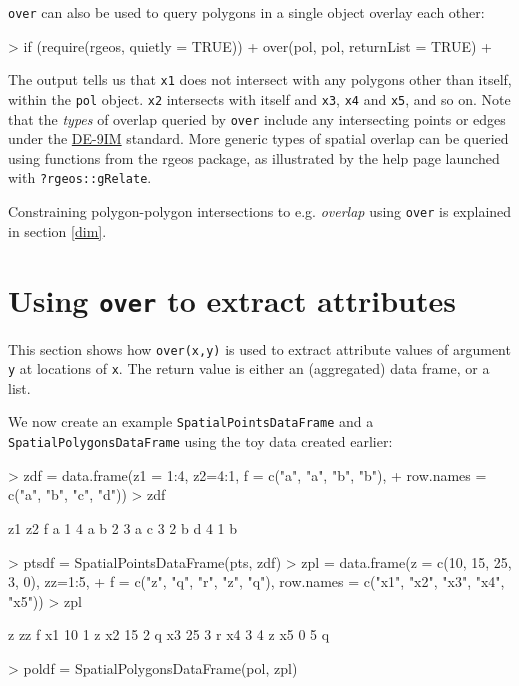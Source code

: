 \documentclass{article}
\newcommand{\code}[1]{{\tt #1}}
\begin{document}
\code{over} can also be used to query polygons in a single object overlay each other:

\begin{Schunk}
\begin{Sinput}
> if (require(rgeos, quietly = TRUE)) {
+  over(pol, pol, returnList = TRUE)
+ }
\end{Sinput}
\end{Schunk}

\noindent
The output tells us that \code{x1} does not intersect with any polygons other than itself, within the \code{pol} object. \code{x2} intersects with itself and \code{x3}, \code{x4} and \code{x5}, and so on.
Note that the \emph{types} of overlap queried by \code{over} include any intersecting points or edges under the \href{https://en.wikipedia.org/wiki/DE-9IM}{DE-9IM} standard.  More generic types of spatial overlap can be queried using functions from the rgeos package, as illustrated by the help page launched with \code{?rgeos::gRelate}.

Constraining polygon-polygon intersections to e.g. {\em overlap} using \code{over} is explained in section \ref{dim}.


\section{Using \code{over} to extract attributes}
\label{attr}

This section shows how \code{over(x,y)} is used to extract attribute
values of argument \code{y} at locations of \code{x}.  The return
value is either an (aggregated) data frame, or a list.

We now create an example \code{SpatialPointsDataFrame} and a
\code{SpatialPolygonsDataFrame} using the toy data created earlier:
\begin{Schunk}
\begin{Sinput}
> zdf = data.frame(z1 = 1:4, z2=4:1, f = c("a", "a", "b", "b"),
+ 	row.names = c("a", "b", "c", "d"))
> zdf
\end{Sinput}
\begin{Soutput}
  z1 z2 f
a  1  4 a
b  2  3 a
c  3  2 b
d  4  1 b
\end{Soutput}
\begin{Sinput}
> ptsdf = SpatialPointsDataFrame(pts, zdf)
> zpl = data.frame(z = c(10, 15, 25, 3, 0), zz=1:5, 
+ 	f = c("z", "q", "r", "z", "q"), row.names = c("x1", "x2", "x3", "x4", "x5"))
> zpl
\end{Sinput}
\begin{Soutput}
    z zz f
x1 10  1 z
x2 15  2 q
x3 25  3 r
x4  3  4 z
x5  0  5 q
\end{Soutput}
\begin{Sinput}
> poldf = SpatialPolygonsDataFrame(pol, zpl)
\end{Sinput}
\end{Schunk}
\end{document}
